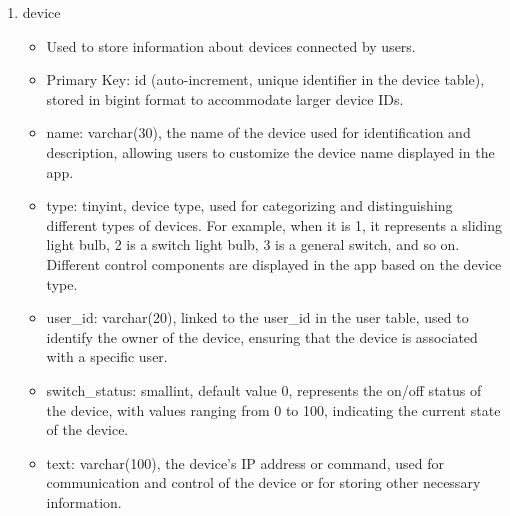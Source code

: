 \begin{enumerate}
\begin{enumerate}
                        \item device
                              \begin{itemize}
                                  \item Used to store information about devices connected by users.
                                  \item Primary Key: id (auto-increment, unique identifier in the device table), stored in bigint format to accommodate larger device IDs.
                                  \item name: varchar(30), the name of the device used for identification and description, allowing users to customize the device name displayed in the app.
                                  \item type: tinyint, device type, used for categorizing and distinguishing different types of devices. For example, when it is 1, it represents a sliding light bulb, 2 is a switch light bulb, 3 is a general switch, and so on. Different control components are displayed in the app based on the device type.
                                  \item user\_id: varchar(20), linked to the user\_id in the user table, used to identify the owner of the device, ensuring that the device is associated with a specific user.
                                  \item switch\_status: smallint, default value 0, represents the on/off status of the device, with values ranging from 0 to 100, indicating the current state of the device.
                                  \item text: varchar(100), the device's IP address or command, used for communication and control of the device or for storing other necessary information.\\
                              \end{itemize}


\end{enumerate}
\end{enumerate}
